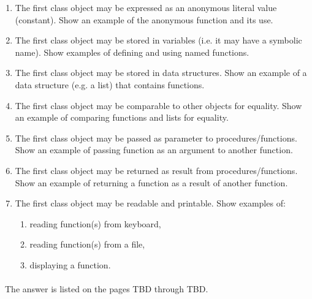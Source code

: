 \documentclass{article}
\begin{document}
		\begin{enumerate}[label=\alph*)]
		
			\item The first class object may be expressed as an anonymous literal value (constant). Show an example of the anonymous function and its use.
			
			\item The first class object may be stored in variables (i.e. it may have a symbolic name). Show examples of defining and using named functions.
			
			\item The first class object may be stored in data structures. Show an example of a data structure (e.g. a list) that contains functions.
			
			\item The first class object may be comparable to other objects for equality. Show an example of comparing functions and lists for equality.
			
			\item The first class object may be passed as parameter to procedures/functions. Show an example of passing function as an argument to another function.
			
			\item The first class object may be returned as result from procedures/functions. Show an example of returning a function as a result of another function.
			
			\item The first class object may be readable and printable. Show examples of:
				\begin{enumerate}[label=-]
				
					\item reading function(s) from keyboard,
					
					\item reading function(s) from a file,
					
					\item displaying a function.
					
				\end{enumerate}
			
		\end{enumerate}
		
\paragraph{}\
		The answer is listed on the pages TBD through TBD.
\paragraph{}\
\end{document}

